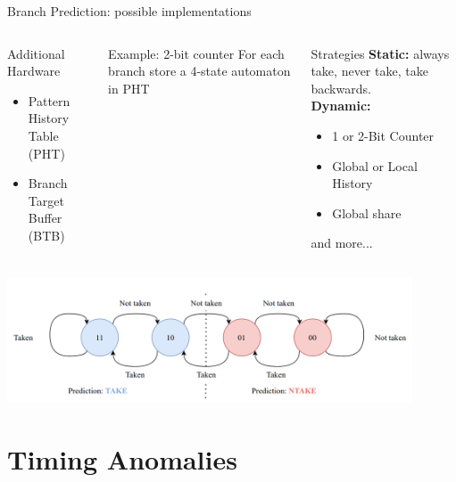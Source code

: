 \documentclass{beamer}
\begin{document}
\begin{frame}{Branch Prediction: possible implementations}
    \begin{columns}

    \begin{block}{Additional Hardware}
        \begin{itemize}
            \item Pattern History Table (PHT)
            \item Branch Target Buffer (BTB)
        \end{itemize}
    \end{block}

    \begin{exampleblock}{Example: 2-bit counter}
        For each branch store a 4-state automaton in PHT
    \end{exampleblock}


    \begin{block}{Strategies}
        \textbf{Static:} always take, never take, take backwards. \\        
        \textbf{Dynamic:} 
        \begin{itemize}
            \item 1 or 2-Bit Counter
            \item Global or Local History
            \item Global share
        \end{itemize}
        and more...
    \end{block}

    \end{columns}

    \includegraphics[width=0.9\textwidth]{pic/two-bit-counter.png}
\end{frame}


\section{Timing Anomalies}
\end{document}
